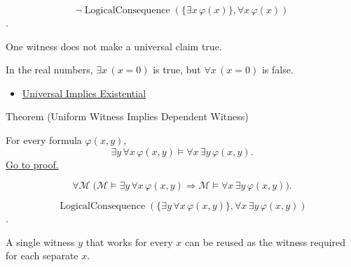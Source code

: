 \begin{remark*}
\[
  \neg\operatorname{LogicalConsequence}(\{\exists x\,\varphi(x)\},\forall x\,\varphi(x))
\].
\end{remark*}

\begin{remark*}[Interpretation]
One witness does not make a universal claim true.
\end{remark*}

\begin{remark*}[Exposition]
In the real numbers, \(\exists x\,(x=0)\) is true, but
\(\forall x\,(x=0)\) is false.
\end{remark*}

\begin{dependencies}
\begin{itemize}
  \item \hyperref[thm:universal-implies-existential]{Universal Implies Existential}
\end{itemize}
\end{dependencies}

\begin{theorembox}{Theorem (Uniform Witness Implies Dependent Witness)}
\begin{theorem}
\label{thm:uniform-witness-implies-dependent-witness}
For every formula \(\varphi(x,y)\),
\[
\exists y\,\forall x\,\varphi(x,y)
\models
\forall x\,\exists y\,\varphi(x,y).
\]
\hyperref[prf:uniform-witness-implies-dependent-witness]{Go to proof.}
\end{theorem}
\end{theorembox}

\begin{remark*}
\[
\forall \mathcal M\;
\bigl(
\mathcal M\models\exists y\,\forall x\,\varphi(x,y)
\Rightarrow
\mathcal M\models\forall x\,\exists y\,\varphi(x,y)
\bigr).
\]
\end{remark*}

\begin{remark*}
\[
\operatorname{LogicalConsequence}(\{\exists y\,\forall x\,\varphi(x,y)\},
\forall x\,\exists y\,\varphi(x,y))
\].
\end{remark*}

\begin{remark*}[Interpretation]
A single witness \(y\) that works for every \(x\) can be reused as the
witness required for each separate \(x\).
\end{remark*}

